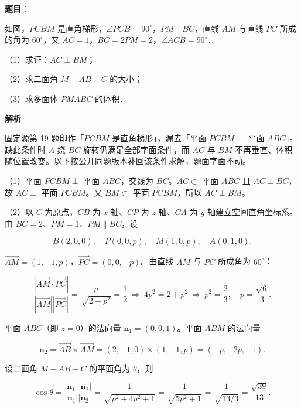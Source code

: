 \begin{answer}

\textbf{题目}：

如图，$PCBM$ 是直角梯形，$\angle PCB=90^\circ$，$PM\parallel BC$，直线 $AM$ 与直线 $PC$ 所成的角为 $60^\circ$，又 $AC=1$，$BC=2PM=2$，$\angle ACB=90^\circ$．
\nopagebreak[4]
\begin{center}\end{center}
\nopagebreak[4]
（1）求证：$AC\perp BM$；

（2）求二面角 $M-AB-C$ 的大小；

（3）求多面体 $PMABC$ 的体积．

\textbf{解析}

\begin{gktip}
固定源第 19 题印作「$PCBM$ 是直角梯形」，漏去「平面 $PCBM\perp$ 平面 $ABC$」。缺此条件时 $A$ 绕 $BC$ 旋转仍满足全部字面条件，而 $AC$ 与 $BM$ 不再垂直、体积随位置改变。以下按公开同题版本补回该条件求解，题面字面不动。
\end{gktip}

（1）平面 $PCBM\perp$ 平面 $ABC$，交线为 $BC$。$AC\subset$ 平面 $ABC$ 且 $AC\perp BC$，故 $AC\perp$ 平面 $PCBM$。又 $BM\subset$ 平面 $PCBM$，所以 $AC\perp BM$。

（2）以 $C$ 为原点，$CB$ 为 $x$ 轴、$CP$ 为 $z$ 轴、$CA$ 为 $y$ 轴建立空间直角坐标系。由 $BC=2$、$PM=1$、$PM\parallel BC$，设

\nopagebreak[4]
\[B(2,0,0),\quad P(0,0,p),\quad M(1,0,p),\quad A(0,1,0).\]

$\overrightarrow{AM}=(1,-1,p)$，$\overrightarrow{PC}=(0,0,-p)$。由直线 $AM$ 与 $PC$ 所成角为 $60^\circ$：

\nopagebreak[4]
\[\frac{|\overrightarrow{AM}\cdot\overrightarrow{PC}|}{|\overrightarrow{AM}||\overrightarrow{PC}|}
=\frac{p}{\sqrt{2+p^2}}=\frac12
\ \Longrightarrow\ 4p^2=2+p^2
\ \Longrightarrow\ p^2=\frac23,\quad p=\frac{\sqrt6}{3}.\]

平面 $ABC$（即 $z=0$）的法向量 $\mathbf n_1=(0,0,1)$。平面 $ABM$ 的法向量

\nopagebreak[4]
\[\mathbf n_2=\overrightarrow{AB}\times\overrightarrow{AM}=(2,-1,0)\times(1,-1,p)=(-p,-2p,-1).\]

设二面角 $M-AB-C$ 的平面角为 $\theta$，则

\nopagebreak[4]
\[\cos\theta=\frac{|\mathbf n_1\cdot\mathbf n_2|}{|\mathbf n_1||\mathbf n_2|}
=\frac{1}{\sqrt{p^2+4p^2+1}}
=\frac{1}{\sqrt{5p^2+1}}
=\frac{1}{\sqrt{13/3}}=\frac{\sqrt{39}}{13}.\]


\end{answer}
